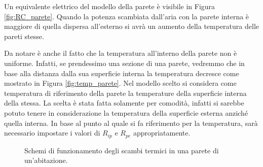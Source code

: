 \documentclass[laurea,oneside,11pt]{USiena_tesiLM3}
\begin{document}
Un equivalente elettrico del modello della parete è visibile in Figura \ref{fig:RC_parete}.
Quando la potenza scambiata dall'aria con la parete  interna è maggiore di quella dispersa all'esterno si avrà un aumento della temperatura delle pareti stesse.

Da notare è anche il fatto che la temperatura all'interno della parete non è uniforme. Infatti, se prendessimo una sezione di una parete, vedremmo che in base alla distanza dalla sua superficie interna la temperatura decresce come mostrato in Figura \ref{fig:temp_parete}.  Nel modello scelto si considera come temperatura di riferimento della parete la temperature della superficie interna della stessa. La scelta è stata fatta solamente per comodità, infatti si sarebbe potuto tenere in considerazione la temperatura della superficie esterna anziché quella interna. In base al punto al quale si fa riferimento per la temperatura, sarà necessario impostare  i valori di $R_{ip}$ e $R_{pe}$ appropriatamente.   

 \begin{figure}[!ht]
 \centering
 \hspace{5mm}
 \caption{Schemi di funzionamento degli scambi termici in una parete di un'abitazione.}
 \end{figure}
\end{document}
